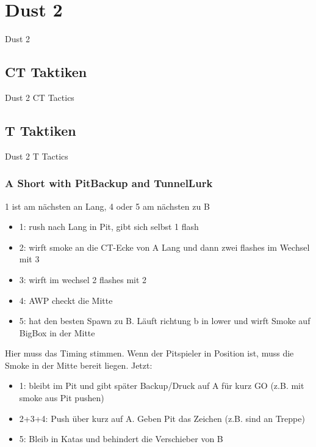 \newpage




\chapter{Dust 2}
\label{chap:dust2}
Dust 2

\section{CT Taktiken}
\label{sect:dust2_ct}
Dust 2 CT Tactics

\section{T Taktiken}
\label{sect:dust2_t}
Dust 2 T Tactics

\subsection{A Short with PitBackup and TunnelLurk}
\label{subsect:dust2_short_pit_tunnel}
1 ist am nächsten an Lang, 4 oder 5 am nächsten zu B
\begin{itemize}
\item 1: rush nach Lang in Pit, gibt sich selbst 1 flash
\item 2: wirft smoke an die CT-Ecke von A Lang und dann zwei flashes im Wechsel mit 3
\item 3: wirft im wechsel 2 flashes mit 2
\item 4: AWP checkt die Mitte
\item 5: hat den besten Spawn zu B. Läuft richtung b in lower und wirft Smoke auf BigBox in der Mitte
\end{itemize}

Hier muss das Timing stimmen. 
Wenn der Pitspieler in Position ist, muss die Smoke in der Mitte bereit liegen.
Jetzt:
\begin{itemize}
\item 1: bleibt im Pit und gibt später Backup/Druck auf A für kurz GO (z.B. mit smoke aus Pit pushen)
\item 2+3+4: Push über kurz auf A. Geben Pit das Zeichen (z.B. sind an Treppe)
\item 5: Bleib in Katas und behindert die Verschieber von B
\end{itemize}

